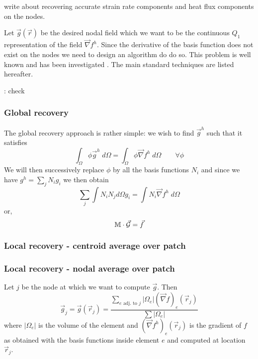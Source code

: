 
write about recovering accurate strain rate components and heat flux components on the nodes.

Let $\vec g(\vec r)$  be the desired nodal 
field which we want to be the continuous $Q_1$ representation of the field $\vec \nabla f^h$.
Since the derivative of the basis function does not exist on the nodes we need to design
an algorithm do do so. This problem is well known and has been 
investigated 
.
The main standard techniques are listed hereafter.

\Literature: check \cite{zibz98}

\subsubsection{Global recovery}

The global recovery approach is rather simple: we wish to find $\vec g^h$
such that it satisfies
\[
\int_\Omega \phi \vec g^h \; d\Omega  = \int_\Omega \phi \vec\nabla f^h \; d\Omega 
\quad\quad \forall \phi
\] 
We will then successively replace $\phi$ by all the basis functions $N_i$ 
and since we have $g^h=\sum_j N_i g_i$ we then obtain
\[
\sum_j \int N_i N_j d\Omega g_i = \int N_i  \vec\nabla f^h \; d\Omega 
\]
or, 
\[
\mathbb{M} \cdot \vec{\cal G} = \vec f
\]



\subsubsection{Local recovery - centroid average over patch}





\subsubsection{Local recovery - nodal average over patch}

Let $j$ be the node at which we want to compute $\vec g$.
Then 
\[
\vec g_j = \vec g(\vec r_j) = 
\frac{\sum\limits_{ e \text{ adj. to }j} |\Omega_e| (\vec\nabla f)_e(\vec r_j) }{\sum |\Omega_e|}
\]
where $|\Omega_e|$ is the volume of the element and $(\vec\nabla f^h)_e(\vec r_j)$
is the gradient of $f$ as obtained with the basis functions inside element $e$ and 
computed at location $\vec r_j$.

